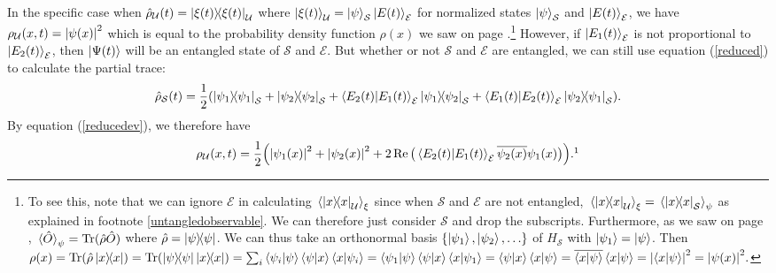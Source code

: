      In the specific case when $\hat{\rho}_\mathcal{U}(t)=\dyad{\xi(t)}_\mathcal{U}$ where $\ket{\xi(t)}_\mathcal{U}=\ket{\psi}_\mathcal{S}\ket{E(t)}_\mathcal{E}$ for normalized states $\ket{\psi}_\mathcal{S}$ and $\ket{E(t)}_\mathcal{E}$, we have $\rho_\mathcal{U}(x, t) =\abs{\psi(x)}^2$ which is equal to the probability density function $\rho(x)$ we saw on page \pageref{rhodensity}.\footnote{To see this, note that we can ignore $\mathcal{E}$ in calculating $\ev*{\dyad{x}_\mathcal{U}}_\xi$ since when $\mathcal{S}$ and $\mathcal{E}$ are not entangled, $\ev*{\dyad{x}_\mathcal{U}}_\xi = \ev*{\dyad{x}_\mathcal{S}}_\psi$ as explained in footnote \ref{untangledobservable}. We can therefore just consider $\mathcal{S}$ and drop the subscripts.
    Furthermore, as we saw on page \pageref{traceev}, $\ev*{\hat{O}}_\psi=\Tr(\hat{\rho}\hat{O})$ where $\hat{\rho}=\dyad{\psi}$. 
    We can thus take an orthonormal basis $\{\ket{\psi_1},\ket{\psi_2},\ldots\}$ of $H_\mathcal{S}$ with $\ket{\psi_1}=\ket{\psi}$. 
    Then $\rho(x)=\Tr(\hat{\rho}\dyad{x})=\Tr(\dyad{\psi}\dyad{x})=\sum_i\ip{\psi_i}{\psi}\ip{\psi}{x}\ip{x}{\psi_i}=\ip{\psi_1}{\psi}\ip{\psi}{x}\ip{x}{\psi_1} =\ip{\psi}{x}\ip{x}{\psi}=\overline{\ip{x}{\psi}}\ip{x}{\psi}=\abs{\ip{x}{\psi}}^2=\abs{\psi(x)}^2.$} 
    However, if $\ket{E_1(t)}_\mathcal{E}$ is not proportional to $\ket{E_2(t)}_\mathcal{E}$, then $\ket{\Psi(t)}$ will be an entangled state of $\mathcal{S}$ and $\mathcal{E}$. But whether or not $\mathcal{S}$ and $\mathcal{E}$ are entangled, we can still use equation (\ref{reduced}) to calculate the partial trace:
    $$\hat{\rho}_\mathcal{S}(t)=\frac{1}{2}(\dyad{\psi_1}_\mathcal{S}+\dyad{\psi_2}_\mathcal{S}+\ip{E_2(t)}{E_1(t)}_\mathcal{E} \dyad{\psi_1}{\psi_2}_\mathcal{S}+\ip{E_1(t)}{E_2(t)}_\mathcal{E} \dyad{\psi_2}{\psi_1}_\mathcal{S}).$$
    By equation (\ref{reducedev}), we therefore have
    \begin{equation}\rho_\mathcal{U}(x, t)=\frac{1}{2}\Big(\abs{\psi_1(x)}^2+\abs{\psi_2(x)}^2+2\Re\big(\ip{E_2(t)}{E_1(t)}_\mathcal{E}\overline{\psi_2(x)}\psi_1(x)\big)\Big).\protect\footnotemark
    \end{equation}
